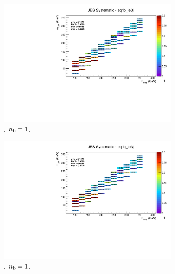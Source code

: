 \begin{figure}[ht!]
\begin{subfigure}[b]{0.32\textwidth}
    \includegraphics[width=\textwidth, page=8]{Figs/sms/t2cc/v37/systs/T2cc_JES_eq1b_le3j.pdf}
    \caption{\njlow, $n_{\text{b}} = 1$.}
  \end{subfigure}
  \begin{subfigure}[b]{0.32\textwidth}
    \includegraphics[width=\textwidth, page=1]{Figs/sms/t2cc/v37/systs/T2cc_JES_eq1b_le3j.pdf}
    \caption{\njlow, $n_{\text{b}} = 1$.}
    \label{fig:sms-jes-t2cc-le3j-1b}
  \end{subfigure}\\
  \begin{subfigure}[b]{0.32\textwidth}

\end{subfigure}
\end{figure}
